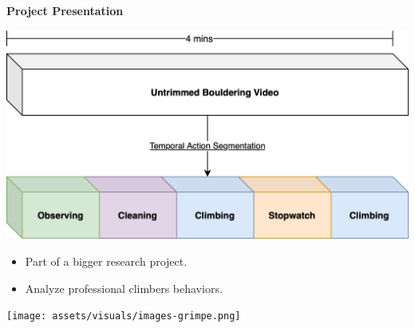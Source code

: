 
\begin{frame}
    \begin{minipage}{0.48\linewidth}
        \textbf{Project Presentation}

        \vspace{0.5em}

        \centering
        \includegraphics[width=\textwidth]{assets/visuals/temporal-action-segmentation-visual.png}
        \cite{ding2023temporal}

        \vspace{0.5em}

        \begin{itemize}
            \item Part of a bigger research project.
            \item Analyze professional climbers behaviors.
        \end{itemize}
    \end{minipage}
    \hfill
    \begin{minipage}{0.48\linewidth}
        \centering
        \texttt{[image: assets/visuals/images-grimpe.png]}

    \end{minipage}
\end{frame}


